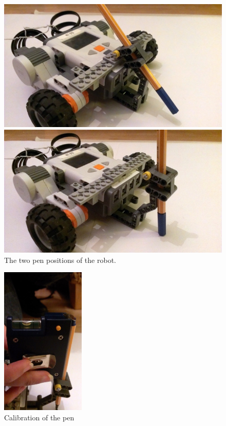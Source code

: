 \documentclass{scrartcl}
\begin{document}
\begin{figure}
\centering
\begin{minipage}{.5\textwidth}
  \centering
  \includegraphics[width=.8\linewidth]{img/pen_up.jpg}
\end{minipage}%
\begin{minipage}{.5\textwidth}
  \centering
  \includegraphics[width=.8\linewidth]{img/pen_down.jpg}
  
\end{minipage}
\caption{The two pen positions of the robot.}
\label{fig:pen_position}
\end{figure}

\begin{figure}
 \center
 \includegraphics[width= 4cm]{img/pen_adjust.jpg}
 \caption{Calibration of the pen}
 \label{fig:pen_calib}
\end{figure}
\end{document}
